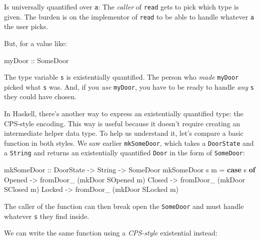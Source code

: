 \documentclass[]{article}
\newenvironment{Shaded}{}{}
\newcommand{\DataTypeTok}[1]{\textcolor[rgb]{0.56,0.13,0.00}{#1}}
\newcommand{\KeywordTok}[1]{\textcolor[rgb]{0.00,0.44,0.13}{\textbf{#1}}}
\newcommand{\NormalTok}[1]{#1}
\newcommand{\OtherTok}[1]{\textcolor[rgb]{0.00,0.44,0.13}{#1}}
\begin{document}
Is universally quantified over \texttt{a}: The \emph{caller} of \texttt{read}
gets to pick which type is given. The burden is on the implementor of
\texttt{read} to be able to handle whatever \texttt{a} the user picks.

But, for a value like:

\begin{Shaded}
\begin{Highlighting}[]
\OtherTok{myDoor ::} \DataTypeTok{SomeDoor}
\end{Highlighting}
\end{Shaded}

The type variable \texttt{s} is existentially quantified. The person who
\emph{made} \texttt{myDoor} picked what \texttt{s} was. And, if you \emph{use}
\texttt{myDoor}, you have to be ready to handle \emph{any} \texttt{s} they could
have chosen.

In Haskell, there's another way to express an existentially quantified type: the
CPS-style encoding. This way is useful because it doesn't require creating an
intermediate helper data type. To help us understand it, let's compare a basic
function in both styles. We saw earlier \texttt{mkSomeDoor}, which takes a
\texttt{DoorState} and a \texttt{String} and returns an existentially quantified
\texttt{Door} in the form of \texttt{SomeDoor}:

\begin{Shaded}
\begin{Highlighting}[]
\NormalTok{mkSomeDoor}
\OtherTok{    ::} \DataTypeTok{DoorState}
    \OtherTok{{-}\textgreater{}} \DataTypeTok{String}
    \OtherTok{{-}\textgreater{}} \DataTypeTok{SomeDoor}
\NormalTok{mkSomeDoor s m }\OtherTok{=} \KeywordTok{case}\NormalTok{ s }\KeywordTok{of}
    \DataTypeTok{Opened} \OtherTok{{-}\textgreater{}}\NormalTok{ fromDoor\_ (mkDoor }\DataTypeTok{SOpened}\NormalTok{ m)}
    \DataTypeTok{Closed} \OtherTok{{-}\textgreater{}}\NormalTok{ fromDoor\_ (mkDoor }\DataTypeTok{SClosed}\NormalTok{ m)}
    \DataTypeTok{Locked} \OtherTok{{-}\textgreater{}}\NormalTok{ fromDoor\_ (mkDoor }\DataTypeTok{SLocked}\NormalTok{ m)}
\end{Highlighting}
\end{Shaded}

The caller of the function can then break open the \texttt{SomeDoor} and must
handle whatever \texttt{s} they find inside.

We can write the same function using a \emph{CPS-style} existential instead:
\end{document}
